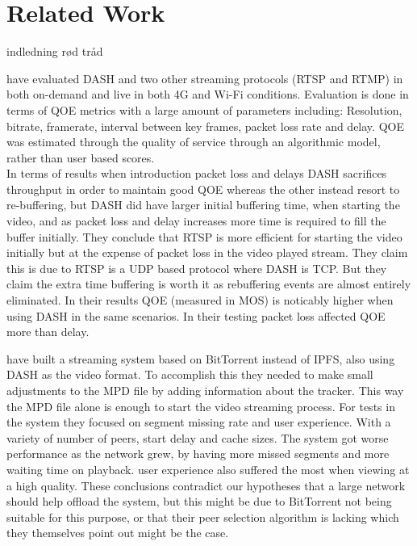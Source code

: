 \chapter{Related Work}

indledning rød tråd

\label{cha:related-work}
\citeauthor{aloman2015performance} \cite{aloman2015performance} have evaluated \acs{DASH} and two other streaming protocols (\acs{RTSP} and \acs{RTMP}) in both on-demand and live in both 4G and Wi-Fi conditions. Evaluation is done in terms of \ac{QOE} metrics with a large amount of parameters including: Resolution, bitrate, framerate, interval between key frames, packet loss rate and delay. \acs{QOE} was estimated through the quality of service through an algorithmic model, rather than user based scores.\\
In terms of results when introduction packet loss and delays \acs{DASH} sacrifices throughput in order to maintain good \acs{QOE} whereas the other instead resort to re-buffering, but \acs{DASH} did have larger initial buffering time, when starting the video, and as packet loss and delay increases more time is required to fill the buffer initially. They conclude that \acs{RTSP} is more efficient for starting the video initially but at the expense of packet loss in the video played stream. They claim this is due to \acs{RTSP} is a UDP based protocol where \acs{DASH} is TCP. But they claim the extra time buffering is worth it as rebuffering events are almost entirely eliminated. In their results \acs{QOE} (measured in MOS) is noticably higher when using \acs{DASH} in the same scenarios. In their testing packet loss affected \acs{QOE} more than delay.




\citeauthor{gazdar2017toward} \cite{gazdar2017toward} have built a streaming system based on BitTorrent instead of \acs{IPFS}, also using \acs{DASH} as the video format. To accomplish this they needed to make small adjustments to the \acs{MPD} file by adding information about the tracker. This way the \acs{MPD} file alone is enough to start the video streaming process. For tests in the system they focused on segment missing rate and user experience. With a variety of number of peers, start delay and cache sizes. The system got worse performance as the network grew, by having more missed segments and more waiting time on playback. user experience also suffered the most when viewing at a high quality. These conclusions contradict our hypotheses that a large network should help offload the system, but this might be due to BitTorrent not being suitable for this purpose, or that their peer selection algorithm is lacking which they themselves point out might be the case.


